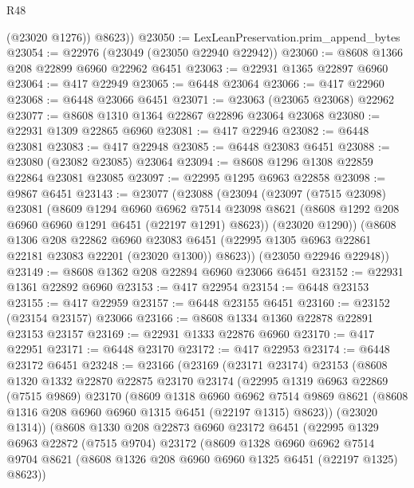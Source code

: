 \begin{lexlean}{R48}
\begin{coremodule}
          (@23020 @1276))
        @8623))
@23050 := LexLeanPreservation.prim_append_bytes
@23054 := @22976 (@23049 (@23050 @22940 @22942))
@23060 := @8608 @1366 @208 @22899 @6960 @22962 @6451
@23063 := @22931 @1365 @22897 @6960
@23064 := @417 @22949
@23065 := @6448 @23064
@23066 := @417 @22960
@23068 := @6448 @23066 @6451
@23071 := @23063 (@23065 @23068) @22962
@23077 := @8608 @1310 @1364 @22867 @22896 @23064 @23068
@23080 := @22931 @1309 @22865 @6960
@23081 := @417 @22946
@23082 := @6448 @23081
@23083 := @417 @22948
@23085 := @6448 @23083 @6451
@23088 := @23080 (@23082 @23085) @23064
@23094 := @8608 @1296 @1308 @22859 @22864 @23081 @23085
@23097 := @22995 @1295 @6963 @22858
@23098 := @9867 @6451
@23143 := @23077
    (@23088
      (@23094
        (@23097
          (@7515 @23098)
          @23081
          (@8609
            @1294
            @6960
            @6962
            @7514
            @23098
            @8621
            (@8608 @1292 @208 @6960 @6960 @1291 @6451 (@22197 @1291) @8623))
          (@23020 @1290))
        (@8608
          @1306
          @208
          @22862
          @6960
          @23083
          @6451
          (@22995 @1305 @6963 @22861 @22181 @23083 @22201 (@23020 @1300))
          @8623))
      (@23050 @22946 @22948))
@23149 := @8608 @1362 @208 @22894 @6960 @23066 @6451
@23152 := @22931 @1361 @22892 @6960
@23153 := @417 @22954
@23154 := @6448 @23153
@23155 := @417 @22959
@23157 := @6448 @23155 @6451
@23160 := @23152 (@23154 @23157) @23066
@23166 := @8608 @1334 @1360 @22878 @22891 @23153 @23157
@23169 := @22931 @1333 @22876 @6960
@23170 := @417 @22951
@23171 := @6448 @23170
@23172 := @417 @22953
@23174 := @6448 @23172 @6451
@23248 := @23166
    (@23169
      (@23171 @23174)
      @23153
      (@8608
        @1320
        @1332
        @22870
        @22875
        @23170
        @23174
        (@22995
          @1319
          @6963
          @22869
          (@7515 @9869)
          @23170
          (@8609
            @1318
            @6960
            @6962
            @7514
            @9869
            @8621
            (@8608 @1316 @208 @6960 @6960 @1315 @6451 (@22197 @1315) @8623))
          (@23020 @1314))
        (@8608
          @1330
          @208
          @22873
          @6960
          @23172
          @6451
          (@22995
            @1329
            @6963
            @22872
            (@7515 @9704)
            @23172
            (@8609
              @1328
              @6960
              @6962
              @7514
              @9704
              @8621
              (@8608 @1326 @208 @6960 @6960 @1325 @6451 (@22197 @1325) @8623))

\end{coremodule}
\end{lexlean}
